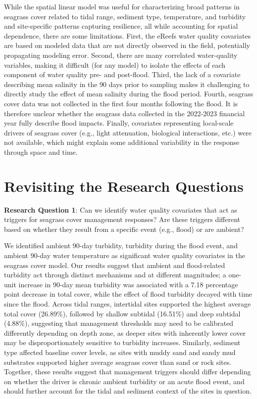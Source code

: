 \documentclass[
  letterpaper,
  DIV=11,
  numbers=noendperiod]{scrartcl}
\begin{document}
While the spatial linear model was useful for characterizing broad
patterns in seagrass cover related to tidal range, sediment type,
temperature, and turbidity and site-specific patterns capturing
resilience, all while accounting for spatial dependence, there are some
limitations. First, the eReefs water quality covariates are based on
modeled data that are not directly observed in the field, potentially
propagating modeling error. Second, there are many correlated
water-quality variables, making it difficult (for any model) to isolate
the effects of each component of water quality pre- and post-flood.
Third, the lack of a covariate describing mean salinity in the 90 days
prior to sampling makes it challenging to directly study the effect of
mean salinity during the flood period. Fourth, seagrass cover data was
not collected in the first four months following the flood. It is
therefore unclear whether the seagrass data collected in the 2022-2023
financial year fully describe flood impacts. Finally, covariates
representing local-scale drivers of seagrass cover (e.g., light
attenuation, biological interactions, etc.) were not available, which
might explain some additional variability in the response through space
and time.

\section{Revisiting the Research
Questions}\label{revisiting-the-research-questions}

\textbf{Research Question 1}: Can we identify water quality covariates
that act as triggers for seagrass cover management responses? Are these
triggers different based on whether they result from a specific event
(e.g., flood) or are ambient?

We identified ambient 90-day turbidity, turbidity during the flood
event, and ambient 90-day water temperature as significant water quality
covariates in the seagrass cover model. Our results suggest that ambient
and flood-related turbidity act through distinct mechanisms and at
different magnitudes; a one-unit increase in 90-day mean turbidity was
associated with a 7.18 percentage point decrease in total cover, while
the effect of flood turbidity decayed with time since the flood. Across
tidal ranges, intertidal sites supported the highest average total cover
(26.89\%), followed by shallow subtidal (16.51\%) and deep subtidal
(4.88\%), suggesting that management thresholds may need to be
calibrated differently depending on depth zone, as deeper sites with
inherently lower cover may be disproportionately sensitive to turbidity
increases. Similarly, sediment type affected baseline cover levels, as
sites with muddy sand and sandy mud substrates supported higher average
seagrass cover than sand or rock sites. Together, these results suggest
that management triggers should differ depending on whether the driver
is chronic ambient turbidity or an acute flood event, and should further
account for the tidal and sediment context of the sites in question.
\end{document}
